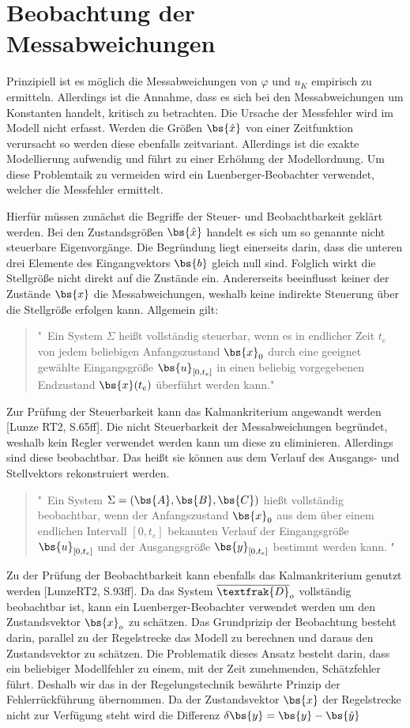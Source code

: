 \section{Beobachtung der Messabweichungen}
Prinzipiell ist es möglich die Messabweichungen von $\varphi$ und $u_K$ empirisch zu ermitteln. Allerdings ist die Annahme, dass es sich bei den Messabweichungen um Konstanten handelt, kritisch zu betrachten. Die Ursache der Messfehler wird im Modell nicht erfasst. Werden die Größen $\bs{\hat{x}}$ von einer Zeitfunktion verursacht so werden diese ebenfalls zeitvariant. Allerdings ist die exakte Modellierung aufwendig und führt zu einer Erhöhung der Modellordnung. Um diese Problemtaik zu vermeiden wird ein Luenberger-Beobachter verwendet, welcher die Messfehler ermittelt.

Hierfür müssen zunächst die Begriffe der Steuer- und Beobachtbarkeit geklärt werden. Bei den Zustandsgrößen $\bs{\hat{x}}$ handelt es sich um so genannte nicht steuerbare Eigenvorgänge. Die Begründung liegt einerseits darin, dass die unteren drei Elemente des Eingangvektors $\bs{b}$ gleich null sind. Folglich wirkt die Stellgröße nicht direkt auf die Zustände ein. Andererseits beeinflusst keiner der Zustände $\bs{x}$ die Messabweichungen, weshalb keine indirekte Steuerung über die Stellgröße erfolgen kann. Allgemein gilt:
\begin{quote}
"\ Ein System $\Sigma$ heißt vollständig steuerbar, wenn es in endlicher Zeit $t_e$ von jedem beliebigen Anfangszustand $\bs{x}_0$ durch eine geeignet gewählte Eingangsgröße $\bs{u}_{[0,t_e]}$ in einen beliebig vorgegebenen Endzustand $\bs{x}(t_e)$ überführt werden kann."
\end{quote}
Zur Prüfung der Steuerbarkeit kann das Kalmankriterium angewandt werden [Lunze RT2, S.65ff]. Die nicht Steuerbarkeit der Messabweichungen begründet, weshalb kein Regler verwendet werden kann um diese zu eliminieren. Allerdings sind diese beobachtbar. Das heißt sie können aus dem Verlauf des Ausgangs- und Stellvektors rekonstruiert werden.
\begin{quote}
"\ Ein System $\Sigma = (\bs{A},\bs{B},\bs{C})$ hießt vollständig beobachtbar, wenn der Anfangszustand $\bs{x}_0$ aus dem über einem endlichen Intervall $[0,t_e]$ bekannten Verlauf der Eingangsgröße $\bs{u}_{[0,t_e]}$ und der Ausgangsgröße $\bs{y}_{[0,t_e]}$ bestimmt werden kann. "
\end{quote}
Zu der Prüfung der Beobachtbarkeit kann ebenfalls das Kalmankriterium genutzt werden [LunzeRT2, S.93ff]. Da das System $\overline{\textfrak{D}}_o$ vollständig beobachtbar ist, kann ein Luenberger-Beobachter verwendet werden um den Zustandsvektor $\bs{x}_o$ zu schätzen. Das Grundprizip der Beobachtung besteht darin, parallel zu der Regelstrecke das Modell zu berechnen und daraus den Zustandsvektor zu schätzen. Die Problematik dieses Ansatz besteht darin, dass ein beliebiger Modellfehler zu einem, mit der Zeit zunehmenden, Schätzfehler führt. Deshalb wir das in der Regelungstechnik bewährte Prinzip der Fehlerrückführung übernommen. Da der Zustandsvektor $\bs{x}$ der Regelstrecke nicht zur Verfügung steht wird die Differenz $\delta\bs{y} = \bs{y} - \bs{\hat{y}}$
